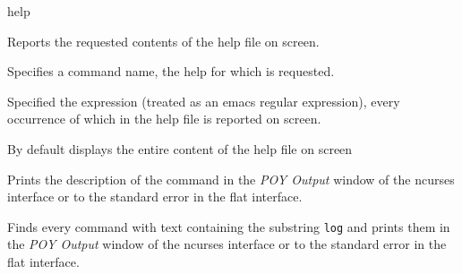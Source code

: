 \begin{command}{help}{}

	
	\begin{poydescription}
         Reports the requested contents of the help file on screen.
	\end{poydescription}
	
	\begin{arguments}
            {Specifies a command name, the help for which is requested.}
            {}

            {Specified the expression (treated as an emacs regular expression), every occurrence
            of which in the help file is reported on screen.}
            {}
	\end{arguments}
	
	\poydefaults{}
        {By default \poy displays the entire content of the help file on screen}
        
	\begin{poyexamples}
            {Prints the description of the command
             in the \emph{POY Output} window of the ncurses
            interface or to the standard error in the flat interface.}

            {Finds every command with text containing the substring \texttt{log} and
            prints them in the \emph{POY Output} window of the ncurses
            interface or to the standard error in the flat interface.}

	\end{poyexamples}

\end{command}


